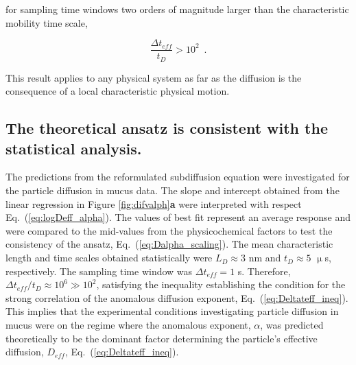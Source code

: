 \documentclass[aps,prl,preprint,superscriptaddress,showkeys,linenumbers]{revtex4-1}
\begin{document}
\noindent for sampling time windows two orders of magnitude larger than the characteristic mobility time scale,

\begin{equation}
\frac{\Delta t_{eff}}{t_D} > 10^2 \,\,\, .
\label{eq:Deltateff_ineq}
\end{equation}

\noindent This result applies to any physical system as far as the diffusion is the consequence of a local characteristic physical motion.

\subsection*{\textcolor{Antonio}{The theoretical ansatz is consistent with the statistical analysis.}}

The predictions from the reformulated subdiffusion equation were investigated for the particle diffusion in mucus data. The slope and intercept obtained from the linear regression in Figure \ref{fig:difvalph}\textbf{a} were interpreted with respect Eq.~(\ref{eq:logDeff_alpha}). \textcolor{Antonio}{The values of best fit represent an average response and were compared to the mid-values from the physicochemical factors to test the consistency of the ansatz, Eq.~(\ref{eq:Dalpha_scaling}).} The mean characteristic length and time scales obtained \textcolor{Antonio}{statistically} were $L_D \approx 3$ nm and $t_D \approx 5$ $\upmu$s, respectively. The sampling time window was $\Delta t_{eff} = 1$ s. Therefore, $\Delta t_{eff} / t_D \approx 10^6 \gg 10^2$, satisfying the inequality \textcolor{Antonio}{establishing the condition for the strong correlation} of the anomalous diffusion exponent, Eq.~(\ref{eq:Deltateff_ineq}). This implies that the experimental conditions investigating particle diffusion in mucus were on the regime where the anomalous exponent, $\alpha$, was predicted theoretically to be the dominant factor determining the particle's effective diffusion, $D_{eff}$, Eq.~(\ref{eq:Deltateff_ineq}).
\end{document}
